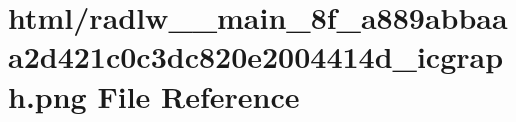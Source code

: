 \hypertarget{radlw____main__8f__a889abbaaa2d421c0c3dc820e2004414d__icgraph_8png}{}\section{html/radlw\+\_\+\+\_\+main\+\_\+8f\+\_\+a889abbaaa2d421c0c3dc820e2004414d\+\_\+icgraph.png File Reference}
\label{radlw____main__8f__a889abbaaa2d421c0c3dc820e2004414d__icgraph_8png}

